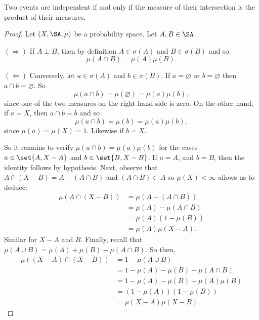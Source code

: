 \begin{proposition}
Two events are independent if and only if the measure of their intersection is the product of their measures.

\begin{proof}
Let $(X, \SA, \mu )$ be a probability space.
Let $A, B \in \SA$.

$(\Rightarrow)$ If $A \perp B$, then by definition $A \in \sigma (A)$ and $B \in \sigma (B)$ and so:
  \[
\mu (A \cap B) = \mu (A)\mu (B).
  \]

$(\Leftarrow)$ Conversely, let $a \in \sigma (A)$ and $b \in \sigma (B)$.
If $a = \varnothing$ or $b = \varnothing$ then $a \cap b = \varnothing$.
So
  \[
\mu (a \cap b) = \mu (\varnothing) = \mu (a)\mu (b),
  \]
since one of the two measures on the right hand side is zero.
On the other hand, if $a = X$, then $a \cap b = b$ and so
  \[
\mu (a \cap b) = \mu (b) = \mu (a)\mu (b),
  \]
since $\mu (a) = \mu (X) = 1$.
Likewise if $b = X$.

So it remains to verify $\mu (a \cap b) = \mu (a)\mu (b)$ for the cases $a \in \set{A,X -A}$ and $b \in \set{B, X-B}$.
If $a = A$, and $b = B$, then the identity follows by hypothesis.
Next, observe that $A \cap (X - B) = A - (A \cap B)$ and $(A \cap B) \subset A$ so $\mu (X) < \infty$ allows us to deduce:
  \[
\begin{aligned}
\mu (A \cap (X - B)) &= \mu (A - (A \cap B)) \\
&= \mu (A) - \mu (A \cap B) \\
&= \mu (A)(1 - \mu (B)) \\
&= \mu (A)\mu (X - A).
\end{aligned}
  \]
Similar for $X-A$ and $B$.
Finally, recall that $\mu (A \cup B) = \mu (A) + \mu (B) - \mu (A \cap B)$.
So then,
  \[
\begin{aligned}
\mu ((X - A) \cap (X - B)) &= 1 - \mu (A \cup B) \\
&= 1 - \mu (A) - \mu (B) + \mu (A \cap B) \\
&= 1 - \mu (A) - \mu (B) + \mu (A)\mu (B) \\
&= (1 - \mu (A))(1 - \mu (B)) \\
&= \mu (X - A)\mu (X - B).
\end{aligned}
  \]
\end{proof}
\end{proposition}
